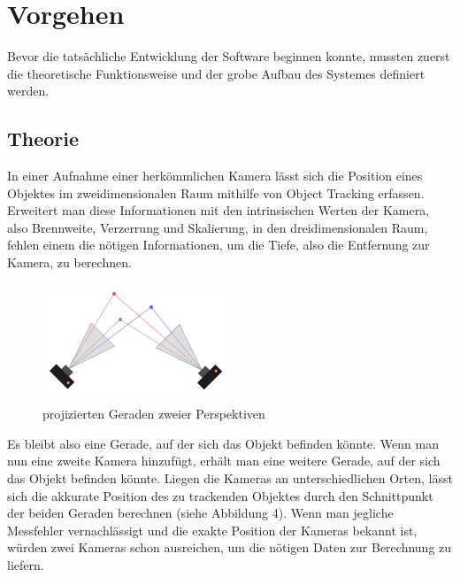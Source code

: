 \documentclass[12pt, ngerman]{article}
\begin{document}
\section{Vorgehen}
Bevor die tatsächliche Entwicklung der Software beginnen konnte, mussten zuerst die theoretische Funktionsweise und der grobe Aufbau des Systemes definiert werden.

\subsection{Theorie}
In einer Aufnahme einer herkömmlichen Kamera lässt sich die Position eines Objektes im zweidimensionalen Raum mithilfe von Object Tracking erfassen. Erweitert man diese Informationen mit den intrinsischen Werten der Kamera, also Brennweite, Verzerrung und Skalierung, in den dreidimensionalen Raum, fehlen einem die nötigen Informationen, um die Tiefe, also die Entfernung zur Kamera, zu berechnen.  

\begin{figure}
\centering
  \includegraphics[angle=0,width=\linewidth]{triangulation.png}
  \caption{projizierten Geraden zweier Perspektiven}
\end{figure}
Es bleibt also eine Gerade, auf der sich das Objekt befinden könnte. Wenn man nun eine zweite Kamera hinzufügt, erhält man eine weitere Gerade, auf der sich das Objekt befinden könnte. Liegen die Kameras an unterschiedlichen Orten, lässt sich die akkurate Position des zu trackenden Objektes durch den Schnittpunkt der beiden Geraden berechnen (siehe Abbildung 4). Wenn man jegliche Messfehler vernachlässigt und die exakte Position der Kameras bekannt ist, würden zwei Kameras schon ausreichen, um die nötigen Daten zur Berechnung zu liefern.  
\end{document}
